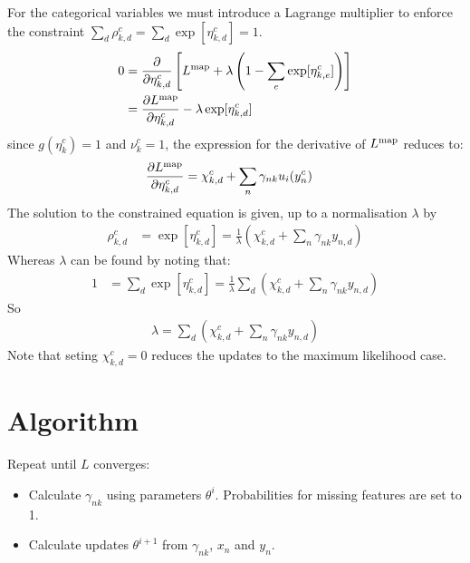 \documentclass[a4paper,fleqn,10pt,openright,oldfontcommands]{memoir}
\newcommand{\g}{\gamma}
\newcommand{\pdff}[2]{\frac{\partial #1}{\partial #2}}
\begin{document}
For the categorical variables we must introduce a Lagrange multiplier to enforce the constraint $\sum_d \rho_{k,d}^c = \sum_d \exp [ \eta_{k,d}^c ] = 1$. 
\begin{align*}
	0 &= 
	\pdff{}{\eta_{k,d}^c} 
	\left[
		L^{\rm map} + \lambda
			\left(
				1 - \sum_e \exp [ \eta_{k,e}^c ]
			\right)
	\right] \\
	&= 	\pdff{L^{\rm map}}{\eta_{k,d}^c} - \lambda \exp[ \eta_{k,d}^c ] \\
\end{align*}
since $g(\eta_k^c) = 1$ and $\nu_k^c = 1$, the expression for the derivative of $L^{\rm map}$ reduces to:
\begin{align*}
    \pdff{L^{\rm map}}{\eta_{k,d}^c}
    &=
      \chi_{k,d}^c 
      + \sum_n \gamma_{nk} u_i(y_n^c)  &
\end{align*}
The solution to the constrained equation is given, up to a normalisation $\lambda$ by
\begin{align*}
	\rho_{k,d}^c 
	&= \exp[ \eta_{k,d}^c ]
	=  \frac{1}{\lambda} \left(\chi_{k,d}^c  + \sum_n \g_{nk} y_{n,d} \right) 
\end{align*}
Whereas $\lambda$ can be found by noting that:
\begin{align*}
	1
	&= \sum_d \exp[ \eta_{k,d}^c ]
	=  \frac{1}{\lambda} \sum_d \left(\chi_{k,d}^c  + \sum_n \g_{nk} y_{n,d} \right) 
\end{align*}
So
\begin{align*}
	\lambda
	=  \sum_d \left(\chi_{k,d}^c  + \sum_n \g_{nk} y_{n,d} \right)  
\end{align*}
Note that seting $\chi_{k,d}^c = 0$ reduces the updates to the maximum likelihood case.

\section*{Algorithm}

Repeat until $L$ converges:
\begin{itemize}
	\item Calculate $\gamma_{nk}$ using parameters $\theta^i$. 
		  Probabilities for missing features are set to 1. 
	\item Calculate updates $\theta^{i+1}$ from $\gamma_{nk}$, $x_n$ and $y_n$.
\end{itemize}
\end{document}
